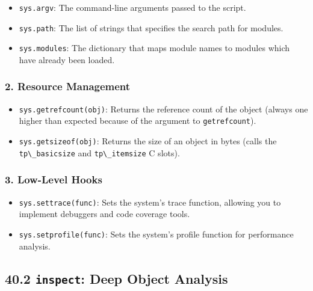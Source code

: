 \begin{itemize}
\tightlist
\item
  \passthrough{\lstinline!sys.argv!}: The command-line arguments passed
  to the script.
\item
  \passthrough{\lstinline!sys.path!}: The list of strings that specifies
  the search path for modules.
\item
  \passthrough{\lstinline!sys.modules!}: The dictionary that maps module
  names to modules which have already been loaded.
\end{itemize}

\hypertarget{resource-management}{%
\subsubsection{2. Resource Management}\label{resource-management}}

\begin{itemize}
\tightlist
\item
  \passthrough{\lstinline!sys.getrefcount(obj)!}: Returns the reference
  count of the object (always one higher than expected because of the
  argument to \passthrough{\lstinline!getrefcount!}).
\item
  \passthrough{\lstinline!sys.getsizeof(obj)!}: Returns the size of an
  object in bytes (calls the \passthrough{\lstinline!tp\_basicsize!} and
  \passthrough{\lstinline!tp\_itemsize!} C slots).
\end{itemize}

\hypertarget{low-level-hooks}{%
\subsubsection{3. Low-Level Hooks}\label{low-level-hooks}}

\begin{itemize}
\tightlist
\item
  \passthrough{\lstinline!sys.settrace(func)!}: Sets the system's trace
  function, allowing you to implement debuggers and code coverage tools.
\item
  \passthrough{\lstinline!sys.setprofile(func)!}: Sets the system's
  profile function for performance analysis.
\end{itemize}

\hypertarget{inspect-deep-object-analysis}{%
\subsection{\texorpdfstring{40.2 \texttt{inspect}: Deep Object
Analysis}{40.2 inspect: Deep Object Analysis}}\label{inspect-deep-object-analysis}}

